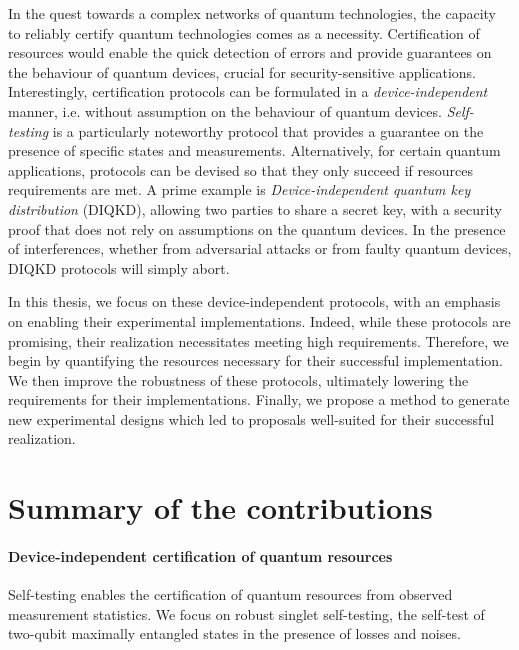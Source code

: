 \medbreak

In the quest towards a complex networks of quantum technologies, the capacity to reliably certify quantum technologies comes as a necessity.
Certification of resources would enable the quick detection of errors and provide guarantees on the behaviour of quantum devices, crucial for security-sensitive applications.
Interestingly, certification protocols can be formulated in a \textit{device-independent} manner, i.e. without assumption on the behaviour of quantum devices. 
\textit{Self-testing} is a particularly noteworthy protocol that provides a guarantee on the presence of specific states and measurements.
Alternatively, for certain quantum applications, protocols can be devised so that they only succeed if resources requirements are met.
A prime example is \textit{Device-independent quantum key distribution} (DIQKD), allowing two parties to share a secret key, with a security proof that does not rely on assumptions on the quantum devices.
In the presence of interferences, whether from adversarial attacks or from faulty quantum devices, DIQKD protocols will simply abort.

\medbreak

In this thesis, we focus on these device-independent protocols, with an emphasis on enabling their experimental implementations.
Indeed, while these protocols are promising, their realization necessitates meeting high requirements.
Therefore, we begin by quantifying the resources necessary for their successful implementation.
We then improve the robustness of these protocols, ultimately lowering the requirements for their implementations.
Finally, we propose a method to generate new experimental designs which led to proposals well-suited for their successful realization.

\section{Summary of the contributions}

\paragraph{Device-independent certification of quantum resources}
Self-testing enables the certification of quantum resources from observed measurement statistics.
We focus on robust singlet self-testing, the self-test of two-qubit maximally entangled states in the presence of losses and noises.

\medbreak

